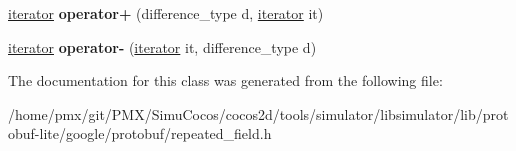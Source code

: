 \begin{DoxyCompactItemize}
\hyperlink{classgoogle_1_1protobuf_1_1internal_1_1RepeatedPtrIterator}{iterator} {\bfseries operator+} (difference\+\_\+type d, \hyperlink{classgoogle_1_1protobuf_1_1internal_1_1RepeatedPtrIterator}{iterator} it)
\item 
\mbox{\label{classgoogle_1_1protobuf_1_1internal_1_1RepeatedPtrIterator_a8d36089dbd29c1f35389f85f71479136}} 
\hyperlink{classgoogle_1_1protobuf_1_1internal_1_1RepeatedPtrIterator}{iterator} {\bfseries operator-\/} (\hyperlink{classgoogle_1_1protobuf_1_1internal_1_1RepeatedPtrIterator}{iterator} it, difference\+\_\+type d)
\end{DoxyCompactItemize}


The documentation for this class was generated from the following file\+:\begin{DoxyCompactItemize}
\item 
/home/pmx/git/\+P\+M\+X/\+Simu\+Cocos/cocos2d/tools/simulator/libsimulator/lib/protobuf-\/lite/google/protobuf/repeated\+\_\+field.\+h\end{DoxyCompactItemize}
